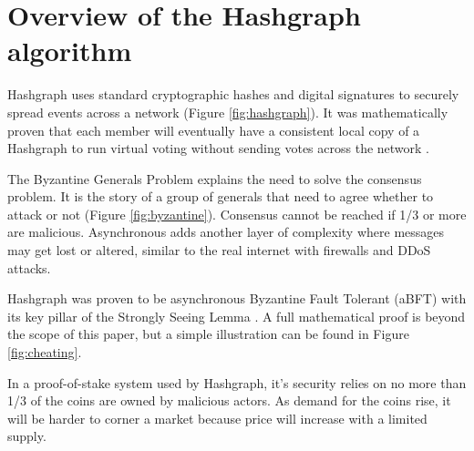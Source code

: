 \section{Overview of the Hashgraph algorithm}



Hashgraph uses standard cryptographic hashes and digital signatures to securely spread events across a network (Figure \ref{fig:hashgraph}). It was mathematically proven that each member will eventually have a consistent local copy of a Hashgraph to run virtual voting without sending votes across the network \cite{baird2016}.


The Byzantine Generals Problem \cite{shostak1982byzantine} explains the need to solve the consensus problem. It is the story of a group of generals that need to agree whether to attack or not (Figure \ref{fig:byzantine}). Consensus cannot be reached if 1/3 or more are malicious. Asynchronous adds another layer of complexity where messages may get lost or altered, similar to the real internet with firewalls and DDoS attacks.



Hashgraph was proven to be asynchronous Byzantine Fault Tolerant (aBFT) with its key pillar of the Strongly Seeing Lemma \cite{baird2016}. A full mathematical proof is beyond the scope of this paper, but a simple illustration can be found in Figure \ref{fig:cheating}.

% 

In a proof-of-stake system used by Hashgraph, it's security relies on no more than 1/3 of the coins are owned by malicious actors. As demand for the coins rise, it will be harder to corner a market because price will increase with a limited supply.

